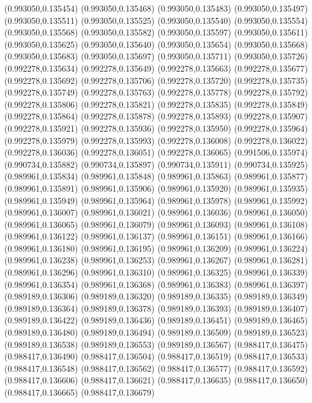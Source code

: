(0.993050,0.135454)
(0.993050,0.135468)
(0.993050,0.135483)
(0.993050,0.135497)
(0.993050,0.135511)
(0.993050,0.135525)
(0.993050,0.135540)
(0.993050,0.135554)
(0.993050,0.135568)
(0.993050,0.135582)
(0.993050,0.135597)
(0.993050,0.135611)
(0.993050,0.135625)
(0.993050,0.135640)
(0.993050,0.135654)
(0.993050,0.135668)
(0.993050,0.135683)
(0.993050,0.135697)
(0.993050,0.135711)
(0.993050,0.135726)
(0.992278,0.135634)
(0.992278,0.135649)
(0.992278,0.135663)
(0.992278,0.135677)
(0.992278,0.135692)
(0.992278,0.135706)
(0.992278,0.135720)
(0.992278,0.135735)
(0.992278,0.135749)
(0.992278,0.135763)
(0.992278,0.135778)
(0.992278,0.135792)
(0.992278,0.135806)
(0.992278,0.135821)
(0.992278,0.135835)
(0.992278,0.135849)
(0.992278,0.135864)
(0.992278,0.135878)
(0.992278,0.135893)
(0.992278,0.135907)
(0.992278,0.135921)
(0.992278,0.135936)
(0.992278,0.135950)
(0.992278,0.135964)
(0.992278,0.135979)
(0.992278,0.135993)
(0.992278,0.136008)
(0.992278,0.136022)
(0.992278,0.136036)
(0.992278,0.136051)
(0.992278,0.136065)
(0.991506,0.135974)
(0.990734,0.135882)
(0.990734,0.135897)
(0.990734,0.135911)
(0.990734,0.135925)
(0.989961,0.135834)
(0.989961,0.135848)
(0.989961,0.135863)
(0.989961,0.135877)
(0.989961,0.135891)
(0.989961,0.135906)
(0.989961,0.135920)
(0.989961,0.135935)
(0.989961,0.135949)
(0.989961,0.135964)
(0.989961,0.135978)
(0.989961,0.135992)
(0.989961,0.136007)
(0.989961,0.136021)
(0.989961,0.136036)
(0.989961,0.136050)
(0.989961,0.136065)
(0.989961,0.136079)
(0.989961,0.136093)
(0.989961,0.136108)
(0.989961,0.136122)
(0.989961,0.136137)
(0.989961,0.136151)
(0.989961,0.136166)
(0.989961,0.136180)
(0.989961,0.136195)
(0.989961,0.136209)
(0.989961,0.136224)
(0.989961,0.136238)
(0.989961,0.136253)
(0.989961,0.136267)
(0.989961,0.136281)
(0.989961,0.136296)
(0.989961,0.136310)
(0.989961,0.136325)
(0.989961,0.136339)
(0.989961,0.136354)
(0.989961,0.136368)
(0.989961,0.136383)
(0.989961,0.136397)
(0.989189,0.136306)
(0.989189,0.136320)
(0.989189,0.136335)
(0.989189,0.136349)
(0.989189,0.136364)
(0.989189,0.136378)
(0.989189,0.136393)
(0.989189,0.136407)
(0.989189,0.136422)
(0.989189,0.136436)
(0.989189,0.136451)
(0.989189,0.136465)
(0.989189,0.136480)
(0.989189,0.136494)
(0.989189,0.136509)
(0.989189,0.136523)
(0.989189,0.136538)
(0.989189,0.136553)
(0.989189,0.136567)
(0.988417,0.136475)
(0.988417,0.136490)
(0.988417,0.136504)
(0.988417,0.136519)
(0.988417,0.136533)
(0.988417,0.136548)
(0.988417,0.136562)
(0.988417,0.136577)
(0.988417,0.136592)
(0.988417,0.136606)
(0.988417,0.136621)
(0.988417,0.136635)
(0.988417,0.136650)
(0.988417,0.136665)
(0.988417,0.136679)
